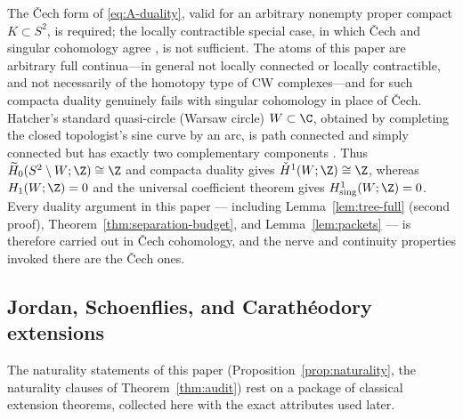 \begin{warning}\label{warn:A-cech}
The \v{C}ech form of \eqref{eq:A-duality}, valid for an arbitrary
nonempty proper compact $K\subset S^2$, is required; the locally
contractible special case, in which \v{C}ech and singular cohomology
agree \cite{Hat02}, is not sufficient.  The atoms of this paper are
arbitrary full continua---in general not locally connected or locally
contractible, and not necessarily of the homotopy type of CW
complexes---and for such compacta duality genuinely fails with singular
cohomology in place of \v{C}ech.  Hatcher's standard quasi-circle (Warsaw
circle) $W\subset\C$, obtained by completing the closed topologist's sine
curve by an arc, is path connected and simply connected but has exactly two
complementary components \cite[Exercise~1.3.7 and pp.~255--256]{Hat02}.
Thus
$\widetilde H_0(S^2\setminus W;\Z)\cong\Z$ and compacta duality gives
$\check H^1(W;\Z)\cong\Z$, whereas $H_1(W;\Z)=0$ and the universal
coefficient theorem gives $H^1_{\mathrm{sing}}(W;\Z)=0$.  Every duality argument in this paper ---
including Lemma~\ref{lem:tree-full} (second proof),
Theorem~\ref{thm:separation-budget}, and Lemma~\ref{lem:packets} --- is therefore carried out in \v{C}ech
cohomology, and the nerve and continuity properties invoked there are the
\v{C}ech ones.
\end{warning}

\subsection{Jordan, Schoenflies, and Carath\'eodory extensions}
\label{subsec:A-extension}

The naturality statements of this paper
(Proposition~\ref{prop:naturality}, the naturality clauses of
Theorem~\ref{thm:audit}) rest on a package of classical extension
theorems, collected here with the exact attributes used later.

